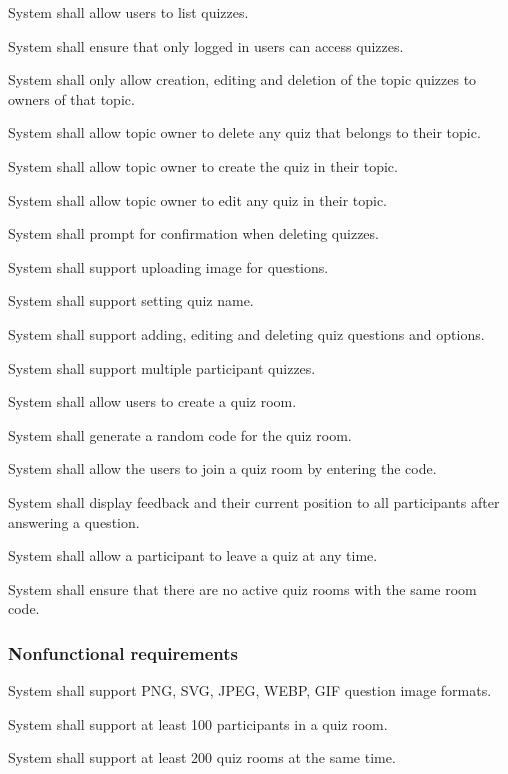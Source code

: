 \begin{frlist}
    \item System shall allow users to list quizzes.
    \item System shall ensure that only logged in users can access quizzes.
    \item System shall only allow creation, editing and deletion of the topic quizzes to owners of that topic.
    \item System shall allow topic owner to delete any quiz that belongs to their topic.
    \item System shall allow topic owner to create the quiz in their topic.
    \item System shall allow topic owner to edit any quiz in their topic.
    \item System shall prompt for confirmation when deleting quizzes.
    \item System shall support uploading image for questions.
    \item System shall support setting quiz name.
    \item System shall support adding, editing and deleting quiz questions and options.
    \item System shall support multiple participant quizzes.
    \item System shall allow users to create a quiz room.
    \item System shall generate a random code for the quiz room.
    \item System shall allow the users to join a quiz room by entering the code.
    \item System shall display feedback and their current position to all participants after answering a question.
    \item System shall allow a participant to leave a quiz at any time.
    \item System shall ensure that there are no active quiz rooms with the same room code.
\end{frlist}


\subsubsection{Nonfunctional requirements}


\begin{nfrlist}
    \item System shall support PNG, SVG, JPEG, WEBP, GIF question image formats.
    \item System shall support at least 100 participants in a quiz room.
    \item System shall support at least 200 quiz rooms at the same time.
\end{nfrlist}

